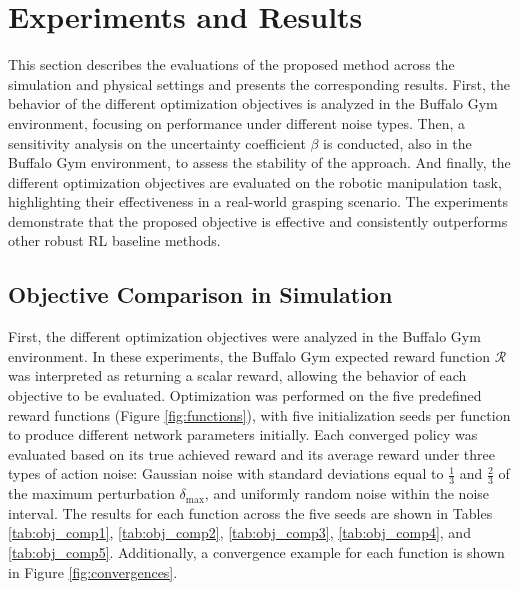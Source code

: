 \documentclass[./dissertation.tex]{subfiles}
\begin{document}
\section{Experiments and Results}
\label{sec:exps_and_results}
This section describes the evaluations of the proposed method across the simulation and physical settings and presents the corresponding results. First, the behavior of the different optimization objectives is analyzed in the Buffalo Gym environment, focusing on performance under different noise types. Then, a sensitivity analysis on the uncertainty coefficient $\beta$ is conducted, also in the Buffalo Gym environment, to assess the stability of the approach. And finally, the different optimization objectives are evaluated on the robotic manipulation task, highlighting their effectiveness in a real-world grasping scenario. The experiments demonstrate that the proposed objective is effective and consistently outperforms other robust RL baseline methods.

\subsection{Objective Comparison in Simulation}
First, the different optimization objectives were analyzed in the Buffalo Gym environment. In these experiments, the Buffalo Gym expected reward function $\mathcal{R}$ was interpreted as returning a scalar reward, allowing the behavior of each objective to be evaluated. Optimization was performed on the five predefined reward functions (Figure \ref{fig:functions}), with five initialization seeds per function to produce different network parameters initially. Each converged policy was evaluated based on its true achieved reward and its average reward under three types of action noise: Gaussian noise with standard deviations equal to $\frac{1}{3}$ and $\frac{2}{3}$ of the maximum perturbation $\delta_\text{max}$, and uniformly random noise within the noise interval. The results for each function across the five seeds are shown in Tables \ref{tab:obj_comp1}, \ref{tab:obj_comp2}, \ref{tab:obj_comp3}, \ref{tab:obj_comp4}, and \ref{tab:obj_comp5}. Additionally, a convergence example for each function is shown in Figure \ref{fig:convergences}.
\end{document}
